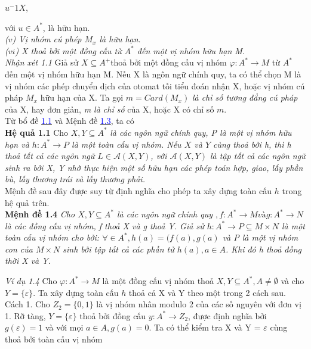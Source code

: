 $u^-1X$,
\begin{flushleft}
\hspace{20mm} với $u \in A^*$, là hữu hạn.\\
\hspace{10mm}\textit{($v$)    Vị nhóm cú phép $M_x$ là hữu hạn}.\\
\hspace{10mm}\textit{($vi$)   X thoả bởi một đồng cấu từ $A^*$ đến một vị nhóm hữu hạn M}.\\
\textit{Nhận xét 1.1}   Giả sử $X \subseteq A^+ $thoả bởi một đồng cấu vị nhóm $\varphi : A^* \to M$ từ $A^*$ đến một vị nhóm hữu hạn M. Nếu X là ngôn ngữ chính quy, ta có thể chọn M là vị nhóm các phép chuyển dịch của otomat tối tiểu đoán nhận X, hoặc vị nhóm cú pháp $M_x$ hữu hạn của X. Ta gọi $m = Card(M_x)$ \textit{là chỉ số tương đẳng cú pháp} của X, hay đơn giản, \textit{m là chỉ số} của X, hoặc X có chỉ số $m$.\\
\hspace{10mm}Từ bổ đề \hyperlink{page.17}{\textcolor{blue}{1.1}} và Mệnh đề \hyperlink{page.17}{\textcolor{blue}{1.3}}, ta có \\
\textbf{Hệ quả 1.1} Cho $X, Y \subseteq A^*$ \textit{là các ngôn ngữ chính quy, P là một vị nhóm hữu hạn và $h : A^* \to P$ là một toàn cấu vị nhóm. Nếu $X$ và $Y$ cùng thoả bởi h, thì h thoả tất cả các ngôn ngữ $L \in \mathcal{A}(X, Y)$, với $\mathcal{A}(X, Y)$ là tập tất cả các ngôn ngữ sinh ra bởi X, Y nhờ thực hiện một số hữu hạn các phép toán hợp, giao, lấy phần bù, lấy thương trái và lấy thương phải.}\\
\hspace{10mm} Mệnh đề sau đây được suy từ định nghĩa cho phép ta xây dựng toàn cấu $h$ trong hệ quả trên.\\
\textbf{Mệnh đề 1.4}    \textit{Cho $X, Y \subseteq A^*$ là các ngôn ngữ chính quy $, f : A^* \to M và g : A^* \to N $ là các đồng cấu vị nhóm, f thoả X và g thoả Y. Giả sử $h : A^* \to P \subseteq M \times N$ là một toàn cấu vị nhóm cho bởi: $\forall \in A^*, h(a) = (f(a),g(a)$ và P là một vị nhóm con của $M \times N$ sinh bởi tập tất cả các phần tử $h(a), a \in A$. Khi đó h thoả đồng thời X và Y}.\\
\begin{flushleft}
\textit{Ví dụ 1.4}  Cho $\varphi : A^* \to M$ là một đồng cấu vị nhóm thoả $X, Y \subseteq A^*, A \ne \emptyset$ và cho $Y = \{ \varepsilon \}$. Ta xây dựng toàn cấu $h$ thoả cả X và Y theo một trong 2 cách sau.\\
\hspace{10mm}Cách 1. Cho $Z_2 = \{ 0,1 \}$ là vị nhóm nhân modulo 2 của các số nguyên với đơn vị 1. Rỡ tàng, $Y = \{ \varepsilon \}$ thoả bởi đồng cấu $y : A^* \to Z_2$, được định nghĩa bởi $g(\varepsilon) = 1$ và với mọi $a \in A, g(a) = 0$. Ta có thể kiểm tra X và Y = {$\varepsilon$} cùng thoả bởi toàn cấu vị nhóm\\

\end{flushleft}
\end{flushleft}
